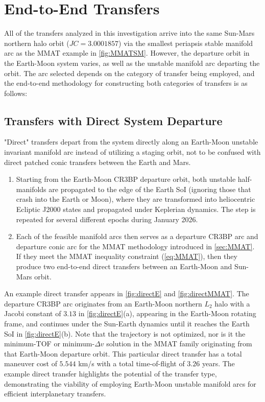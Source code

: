 \section{End-to-End Transfers}\label{sec:Transfers}
All of the transfers analyzed in this investigation arrive into the same Sun-Mars northern halo
orbit ($JC=3.0001857$) via the smallest periapsis stable manifold arc as the MMAT example in
\cref{fig:MMATSM}. However, the departure orbit in the Earth-Moon system varies, as well as the
unstable manifold arc departing the orbit. The arc selected depends on the category of transfer
being employed, and the end-to-end methodology for constructing both categories of transfers is as
follows:

\subsection{Transfers with Direct System Departure}
"Direct" transfers depart from the system directly along an Earth-Moon unstable invariant manifold
arc instead of utilizing a staging orbit, not to be confused with direct patched conic transfers
between the Earth and Mars.
\begin{enumerate}
    \item   Starting from the Earth-Moon CR3BP departure orbit, both unstable half-manifolds are
            propagated to the edge of the Earth SoI (ignoring those that crash into the Earth or
            Moon), where they are transformed into heliocentric Ecliptic J2000 states and
            propagated under Keplerian dynamics. The step is repeated for several different epochs
            during January 2026.
    \item   Each of the feasible manifold arcs then serves as a departure CR3BP arc and departure
            conic arc for the MMAT methodology introduced in \cref{sec:MMAT}. If they meet the MMAT
            inequality constraint (\cref{eq:MMAT}), then they produce two end-to-end direct
            transfers between an Earth-Moon and Sun-Mars orbit.
\end{enumerate}
An example direct transfer appears in \cref{fig:directE} and \cref{fig:directMMAT}. The departure
CR3BP arc originates from an Earth-Moon northern $L_{2}$ halo with a Jacobi constant of
$3.13$ in \cref{fig:directE}(a), appearing in the Earth-Moon rotating frame, and continues under
the Sun-Earth dynamics until it reaches the Earth SoI in \cref{fig:directE}(b). Note that the
trajectory is not optimized, nor is it the minimum-TOF or minimum-$\Delta v$ solution in the MMAT
family originating from that Earth-Moon departure orbit. This particular direct transfer has a
total maneuver cost of $5.544$ km/s with a total time-of-flight of $3.26$ years. The example direct
transfer highlights the potential of the transfer type, demonstrating the viability of employing
Earth-Moon unstable manifold arcs for efficient interplanetary transfers.

